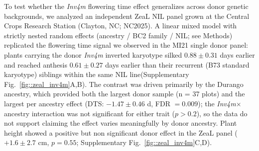 \documentclass[9pt,twocolumn,twoside]{rilabRxiv}
\newcommand{\invfour}{\textit{Inv4m}\xspace}
\begin{document}
To test whether the \invfour flowering time effect generalizes across donor genetic backgrounds, we analyzed an independent ZeaL NIL panel grown at the Central Crops Research Station (Clayton, NC; NC2025). %
A linear mixed model with strictly nested random effects (ancestry / BC2 family / NIL; see Methods) replicated the flowering time signal we observed in the MI21 single donor panel: plants carrying the donor \invfour inverted karyotype silked $0.88 \pm 0.31$ days earlier and reached anthesis $0.61 \pm 0.27$ days earlier than their recurrent (B73 standard karyotype) siblings within the same NIL line(Supplementary Fig.~\ref{fig::zeal_inv4m}A,B). %
The contrast was driven primarily by the Durango ancestry, which provided both the largest donor sample (n = 37 plots) and the largest per ancestry effect (DTS: $-1.47 \pm 0.46$ d, FDR $= 0.009$); the \invfour $\times$ ancestry interaction was not significant for either trait ($p > 0.2$), so the data do not support claiming the effect varies meaningfully by donor ancestry.
Plant height showed a positive but non significant donor effect in the ZeaL panel ($+1.6 \pm 2.7$ cm, $p = 0.55$; Supplementary Fig.~\ref{fig::zeal_inv4m}C,D). 
\end{document}
